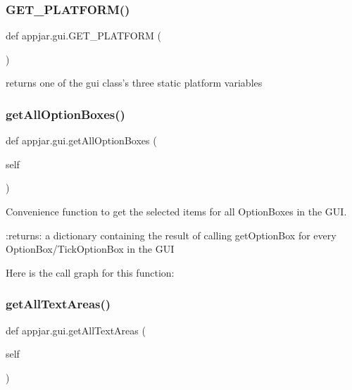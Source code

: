 \subsubsection{\texorpdfstring{G\+E\+T\+\_\+\+P\+L\+A\+T\+F\+O\+R\+M()}{GET\_PLATFORM()}}
{\footnotesize\ttfamily def appjar.\+gui.\+G\+E\+T\+\_\+\+P\+L\+A\+T\+F\+O\+RM (\begin{DoxyParamCaption}{ }\end{DoxyParamCaption})\hspace{0.3cm}{\ttfamily [static]}}

\begin{DoxyVerb}returns one of the gui class's three static platform variables \end{DoxyVerb}
 \mbox{\label{classappjar_1_1gui_a777776f85e235610df69054ed7940d4f}} 
\subsubsection{\texorpdfstring{get\+All\+Option\+Boxes()}{getAllOptionBoxes()}}
{\footnotesize\ttfamily def appjar.\+gui.\+get\+All\+Option\+Boxes (\begin{DoxyParamCaption}\item[{}]{self }\end{DoxyParamCaption})}

\begin{DoxyVerb}Convenience function to get the selected items for all OptionBoxes in the GUI.

:returns: a dictionary containing the result of calling getOptionBox for every OptionBox/TickOptionBox in the GUI
\end{DoxyVerb}
 Here is the call graph for this function\+:
\mbox{\label{classappjar_1_1gui_ad9495afc9d159e2562ef5eb887842825}} 
\subsubsection{\texorpdfstring{get\+All\+Text\+Areas()}{getAllTextAreas()}}
{\footnotesize\ttfamily def appjar.\+gui.\+get\+All\+Text\+Areas (\begin{DoxyParamCaption}\item[{}]{self }\end{DoxyParamCaption})}

